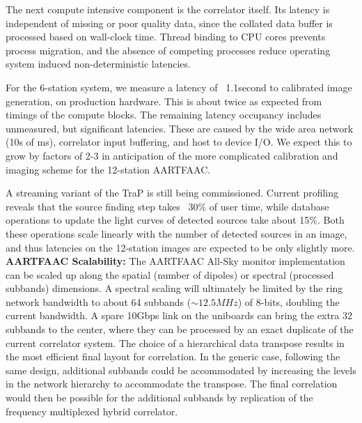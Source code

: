 \documentclass{ws-jai}
\begin{document}
The next  compute intensive component is  the correlator itself. Its  latency is
independent of missing  or poor quality data, since the  collated data buffer is
processed based on wall-clock time. Thread binding to CPU cores prevents process
migration,  and  the absence  of  competing  processes reduce  operating  system
induced non-deterministic latencies.

For the 6-station system, we measure a latency of ~1.1second to calibrated image
generation, on production hardware. This is about twice as expected from timings
of the compute blocks. The  remaining latency occupancy includes unmeasured, but
significant latencies.  These are caused by  the wide area network  (10s of ms),
correlator input buffering,  and host to device  I/O. We expect this  to grow by
factors of 2-3  in anticipation of the more complicated  calibration and imaging
scheme for the 12-station AARTFAAC.

A streaming variant  of the TraP is still being  commissioned. Current profiling
reveals that  the source finding step  takes ~30\% of user  time, while database
operations to update the light curves  of detected sources take about 15\%. Both
these operations scale linearly with the number of detected sources in an image,
and thus  latencies on the  12-station images are  expected to be  only slightly
more.\\

\noindent  \textbf   {AARTFAAC  Scalability:}   The  AARTFAAC   All-Sky  monitor
implementation  can be  scaled  up  along the  spatial  (number  of dipoles)  or
spectral (processed subbands) dimensions. A  spectral scaling will ultimately be
limited by the  ring network bandwidth to about 64  subbands ($\sim12.5 MHz$) of
8-bits, doubling the current bandwidth. A spare 10Gbps link on the uniboards can
bring the  extra 32 subbands to  the center, where  they can be processed  by an
exact duplicate of the current correlator  system.  The choice of a hierarchical
data transpose results  in the most efficient final layout  for correlation.  In
the  generic case,  following  the  same design,  additional  subbands could  be
accommodated by  increasing the levels  in the network hierarchy  to accommodate
the transpose.  The final correlation would  then be possible for the additional
subbands by replication of the frequency multiplexed hybrid correlator.
\end{document}

